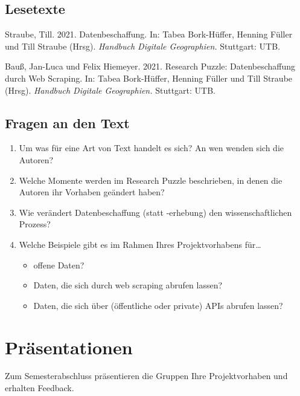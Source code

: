 \documentclass[
  ngerman,
]{article}
\providecommand{\tightlist}{%
  \setlength{\itemsep}{0pt}\setlength{\parskip}{0pt}}
\begin{document}
\hypertarget{lesetexte}{%
\subsection{Lesetexte}\label{lesetexte}}

Straube, Till. 2021. Datenbeschaffung. In: Tabea Bork-Hüffer, Henning Füller und Till Straube (Hrsg). \emph{Handbuch Digitale Geographien.} Stuttgart: UTB.

Bauß, Jan-Luca und Felix Hiemeyer. 2021. Research Puzzle: Datenbeschaffung durch Web Scraping. In: Tabea Bork-Hüffer, Henning Füller und Till Straube (Hrsg). \emph{Handbuch Digitale Geographien.} Stuttgart: UTB.

\hypertarget{fragen-an-den-text-3}{%
\subsection{Fragen an den Text}\label{fragen-an-den-text-3}}

\begin{enumerate}
\def\labelenumi{\arabic{enumi}.}
\tightlist
\item
  Um was für eine Art von Text handelt es sich? An wen wenden sich die Autoren?
\item
  Welche Momente werden im Research Puzzle beschrieben, in denen die Autoren ihr Vorhaben geändert haben?
\item
  Wie verändert Datenbeschaffung (statt -erhebung) den wissenschaftlichen Prozess?
\item
  Welche Beispiele gibt es im Rahmen Ihres Projektvorhabens für\ldots{}

  \begin{itemize}
  \tightlist
  \item
    offene Daten?
  \item
    Daten, die sich durch web scraping abrufen lassen?
  \item
    Daten, die sich über (öffentliche oder private) APIs abrufen lassen?
  \end{itemize}
\end{enumerate}

\hypertarget{pruxe4sentationen}{%
\section{Präsentationen}\label{pruxe4sentationen}}

Zum Semesterabschluss präsentieren die Gruppen Ihre Projektvorhaben und erhalten Feedback.
\end{document}
